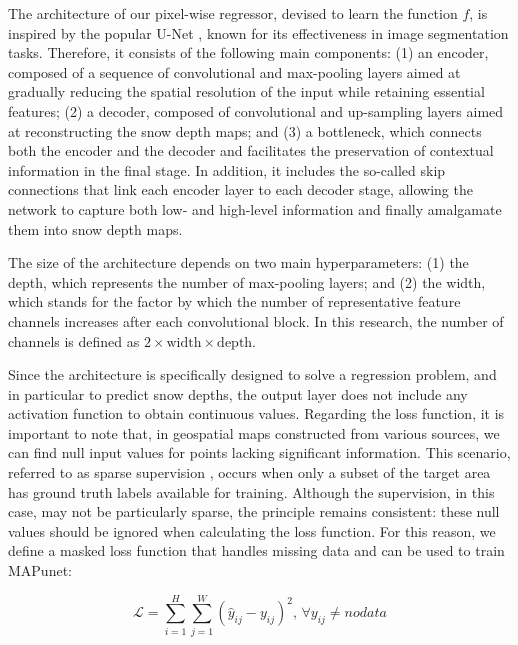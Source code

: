 \documentclass[preprint,12pt]{elsarticle}
\begin{document}
The architecture of our pixel-wise regressor, devised to learn the function $f$, is inspired by the popular U-Net \cite{ronneberger2015u}, known for its effectiveness in image segmentation tasks. Therefore, it consists of the following main components: (1) an encoder, composed of a sequence of convolutional and max-pooling layers aimed at gradually reducing the spatial resolution of the input while retaining essential features; (2) a decoder, composed of convolutional and up-sampling layers aimed at reconstructing the snow depth maps; and (3) a bottleneck, which connects both the encoder and the decoder and facilitates the preservation of contextual information in the final stage. In addition, it includes the so-called skip connections that link each encoder layer to each decoder stage, allowing the network to capture both low- and high-level information and finally amalgamate them into snow depth maps.
 
The size of the architecture depends on two main hyperparameters: (1) the depth, which represents the number of max-pooling layers; and (2) the width, which stands for the factor by which the number of representative feature channels increases after each convolutional block. In this research, the number of channels is defined as $2 \times \text{width} \times \text{depth}$.

Since the architecture is specifically designed to solve a regression problem, and in particular to predict snow depths, the output layer does not include any activation function to obtain continuous values. Regarding the loss function, it is important to note that, in geospatial maps constructed from various sources, we can find null input values for points lacking significant information. This scenario, referred to as sparse supervision \cite{lang2023}, occurs when only a subset of the target area has ground truth labels available for training. Although the supervision, in this case, may not be particularly sparse, the principle remains consistent: these null values should be ignored when calculating the loss function. For this reason, we define a masked loss function that handles missing data and can be used to train MAPunet:

\begin{equation}
    \mathcal{L} = \sum_{i=1}^{H} \sum_{j=1}^{W} (\hat{y}_{ij} - y_{ij})^2 \text{, } \forall y_{ij} \neq nodata
    \label{Eq:masking}
\end{equation}
\end{document}
